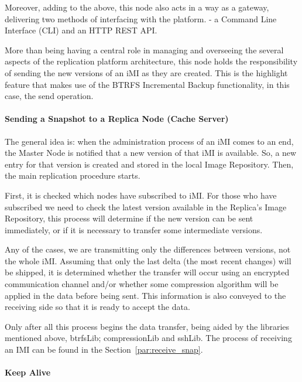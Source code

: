 Moreover, adding to the above, this node also acts in a way as a gateway, delivering two methods of interfacing with the platform. - a Command Line Interface (CLI) and an HTTP REST API.

More than being having a central role in managing and overseeing the several aspects of the replication platform architecture, this node holds the responsibility of sending the new versions of an iMI as they are created. This is the highlight feature that makes use of the BTRFS Incremental Backup functionality, in this case, the send operation.

\paragraph{Sending a Snapshot to a Replica Node (Cache Server)}

The general idea is: when the administration process of an iMI comes to an end, the Master Node is notified that a new version of that iMI is available. So, a new entry for that version is created and stored in the local Image Repository. Then, the main replication procedure starts. 

First, it is checked which nodes have subscribed to iMI. For those who have subscribed we need to check the latest version available in the Replica's Image Repository, this process will determine if the new version can be sent immediately, or if it is necessary to transfer some intermediate versions. 

Any of the cases, we are transmitting only the differences between versions, not the whole iMI. Assuming that only the last delta (the most recent changes) will be shipped, it is determined whether the transfer will occur using an encrypted communication channel and/or whether some compression algorithm will be applied in the data before being sent. This information is also conveyed to the receiving side so that it is ready to accept the data. 

Only after all this process begins the data transfer, being aided by the libraries mentioned above, btrfsLib; compressionLib and sshLib. The process of receiving an IMI can be found in the Section~\ref{par:receive_snap}.

\paragraph{Keep Alive}
\label{par:rep_keep_alive}


